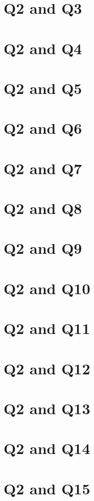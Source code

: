 \documentclass{report}
\begin{document}
\section{Q2 and Q3}\clearpage
\section{Q2 and Q4}\clearpage
\section{Q2 and Q5}\clearpage
\section{Q2 and Q6}\clearpage
\section{Q2 and Q7}\clearpage
\section{Q2 and Q8}\clearpage
\section{Q2 and Q9}\clearpage
\section{Q2 and Q10}\clearpage
\section{Q2 and Q11}\clearpage
\section{Q2 and Q12}\clearpage
\section{Q2 and Q13}\clearpage
\section{Q2 and Q14}\clearpage
\section{Q2 and Q15}\clearpage
\end{document}
